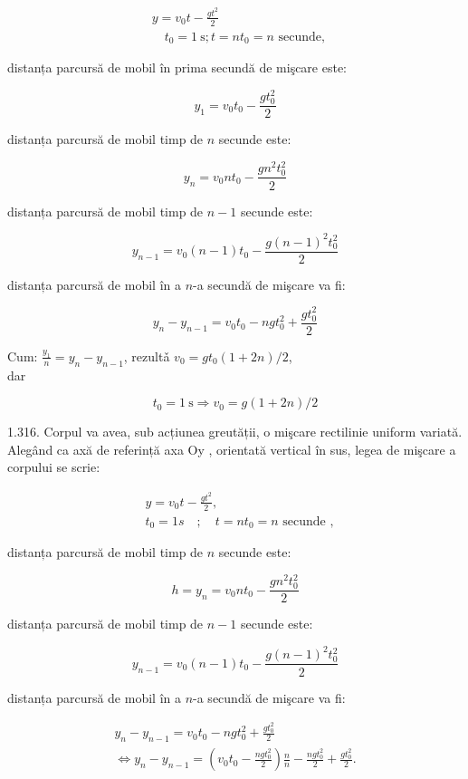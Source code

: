 $$
\begin{aligned}
& y=v_{0} t-\frac{g t^{2}}{2} \\
& \quad t_{0}=1 \mathrm{~s} ; t=n t_{0}=n \text { secunde, }
\end{aligned}
$$

distanța parcursă de mobil în prima secundă de mişcare este:

$$
y_{1}=v_{0} t_{0}-\frac{g t_{0}^{2}}{2}
$$

distanța parcursă de mobil timp de $n$ secunde este:

$$
y_{n}=v_{0} n t_{0}-\frac{g n^{2} t_{0}^{2}}{2}
$$

distanța parcursă de mobil timp de $n-1$ secunde este:

$$
y_{n-1}=v_{0}(n-1) t_{0}-\frac{g(n-1)^{2} t_{0}^{2}}{2}
$$

distanța parcursă de mobil în a $n$-a secundă de mişcare va fi:

$$
y_{n}-y_{n-1}=v_{0} t_{0}-n g t_{0}^{2}+\frac{g t_{0}^{2}}{2}
$$

Cum: $\frac{y_{1}}{n}=y_{n}-y_{n-1}$, rezultǎ $v_{0}=g t_{0}(1+2 n) / 2$,\\
dar

$$
t_{0}=1 \mathrm{~s} \Rightarrow v_{0}=g(1+2 n) / 2
$$

1.316. Corpul va avea, sub acțiunea greutății, o mişcare rectilinie uniform variată. Alegând ca axă de referință axa Oy , orientată vertical în sus, legea de mişcare a corpului se scrie:

$$
\begin{aligned}
& y=v_{0} t-\frac{g t^{2}}{2}, \\
& t_{0}=1 s \quad ; \quad t=n t_{0}=n \text { secunde },
\end{aligned}
$$

distanța parcursă de mobil timp de $n$ secunde este:

$$
h=y_{n}=v_{0} n t_{0}-\frac{g n^{2} t_{0}^{2}}{2}
$$

distanța parcursă de mobil timp de $n-1$ secunde este:

$$
y_{n-1}=v_{0}(n-1) t_{0}-\frac{g(n-1)^{2} t_{0}^{2}}{2}
$$

distanța parcursă de mobil în a $n$-a secundă de mişcare va fi:

$$
\begin{gathered}
y_{n}-y_{n-1}=v_{0} t_{0}-n g t_{0}^{2}+\frac{g t_{0}^{2}}{2} \\
\Leftrightarrow y_{n}-y_{n-1}=\left(v_{0} t_{0}-\frac{n g t_{0}^{2}}{2}\right) \frac{n}{n}-\frac{n g t_{0}^{2}}{2}+\frac{g t_{0}^{2}}{2} .
\end{gathered}
$$

